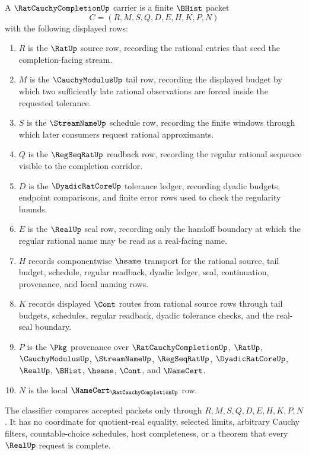 \begin{definition}
\label{def:rat-cauchy-completion-carrier}
A $\RatCauchyCompletionUp$ carrier is a finite $\BHist$ packet
$$
C=(R,M,S,Q,D,E,H,K,P,N)
$$
with the following displayed rows:
\begin{enumerate}
\item $R$ is the $\RatUp$ source row, recording the rational entries that seed the completion-facing stream.
\item $M$ is the $\CauchyModulusUp$ tail row, recording the displayed budget by which two sufficiently late rational observations are forced inside the requested tolerance.
\item $S$ is the $\StreamNameUp$ schedule row, recording the finite windows through which later consumers request rational approximants.
\item $Q$ is the $\RegSeqRatUp$ readback row, recording the regular rational sequence visible to the completion corridor.
\item $D$ is the $\DyadicRatCoreUp$ tolerance ledger, recording dyadic budgets, endpoint comparisons, and finite error rows used to check the regularity bounds.
\item $E$ is the $\RealUp$ seal row, recording only the handoff boundary at which the regular rational name may be read as a real-facing name.
\item $H$ records componentwise $\hsame$ transport for the rational source, tail budget, schedule, regular readback, dyadic ledger, seal, continuation, provenance, and local naming rows.
\item $K$ records displayed $\Cont$ routes from rational source rows through tail budgets, schedules, regular readback, dyadic tolerance checks, and the real-seal boundary.
\item $P$ is the $\Pkg$ provenance over $\RatCauchyCompletionUp$, $\RatUp$, $\CauchyModulusUp$, $\StreamNameUp$, $\RegSeqRatUp$, $\DyadicRatCoreUp$, $\RealUp$, $\BHist$, $\hsame$, $\Cont$, and $\NameCert$.
\item $N$ is the local $\NameCert_{\RatCauchyCompletionUp}$ row.
\end{enumerate}
The classifier compares accepted packets only through $R,M,S,Q,D,E,H,K,P,N$. It has no coordinate for quotient-real equality, selected limits, arbitrary Cauchy filters, countable-choice schedules, host completeness, or a theorem that every $\RealUp$ request is complete.
\end{definition}

